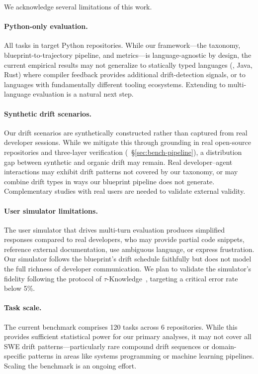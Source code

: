 We acknowledge several limitations of this work.

\paragraph{Python-only evaluation.}
All tasks in \bench{} target Python repositories. While our framework---the taxonomy, blueprint-to-trajectory pipeline, and metrics---is language-agnostic by design, the current empirical results may not generalize to statically typed languages (\eg, Java, Rust) where compiler feedback provides additional drift-detection signals, or to languages with fundamentally different tooling ecosystems. Extending to multi-language evaluation is a natural next step.

\paragraph{Synthetic drift scenarios.}
Our drift scenarios are synthetically constructed rather than captured from real developer sessions. While we mitigate this through grounding in real open-source repositories and three-layer verification (\cf~\S\ref{sec:bench-pipeline}), a distribution gap between synthetic and organic drift may remain. Real developer--agent interactions may exhibit drift patterns not covered by our taxonomy, or may combine drift types in ways our blueprint pipeline does not generate. Complementary studies with real users are needed to validate external validity.

\paragraph{User simulator limitations.}
The user simulator that drives multi-turn evaluation produces simplified responses compared to real developers, who may provide partial code snippets, reference external documentation, use ambiguous language, or express frustration. Our simulator follows the blueprint's drift schedule faithfully but does not model the full richness of developer communication. We plan to validate the simulator's fidelity following the protocol of $\tau$-Knowledge~\citep{tauknowledge2026}, targeting a critical error rate below 5\%.

\paragraph{Task scale.}
The current benchmark comprises 120 tasks across 6 repositories. While this provides sufficient statistical power for our primary analyses, it may not cover all SWE drift patterns---particularly rare compound drift sequences or domain-specific patterns in areas like systems programming or machine learning pipelines. Scaling the benchmark is an ongoing effort.

